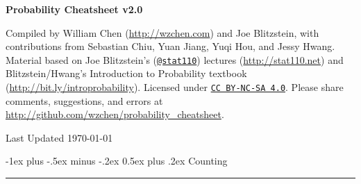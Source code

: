 \documentclass[10pt,landscape]{article}
\makeatletter
\renewcommand{\section}{\@startsection{section}{1}{0mm}%
                                {-1ex plus -.5ex minus -.2ex}%
                                {0.5ex plus .2ex}%
                                {\normalfont\large\bfseries}}
\renewcommand{\subsection}{\@startsection{subsection}{2}{0mm}%
                                {-1explus -.5ex minus -.2ex}%
                                {0.5ex plus .2ex}%
                                {\normalfont\normalsize\bfseries}}
\makeatother
\begin{document}
\raggedright
\footnotesize
\begin{multicols*}{3}

\setlength{\premulticols}{1pt}
\setlength{\postmulticols}{1pt}
\setlength{\multicolsep}{1pt}
\setlength{\columnsep}{2pt}


\begin{center}
    {\color{blue} \Large{\textbf{Probability Cheatsheet v2.0}}} \\
\end{center}


\scriptsize

Compiled by William Chen (\url{http://wzchen.com}) and Joe Blitzstein, with contributions from Sebastian Chiu, Yuan Jiang, Yuqi Hou, and Jessy Hwang. Material based on Joe Blitzstein's (\texttt{\href{http://twitter.com/stat110}{@stat110}}) lectures (\url{http://stat110.net}) and Blitzstein/Hwang's Introduction to Probability textbook (\url{http://bit.ly/introprobability}). Licensed under \texttt{\href{http://creativecommons.org/licenses/by-nc-sa/4.0/}{CC BY-NC-SA 4.0}}. Please share comments, suggestions, and errors at \url{http://github.com/wzchen/probability_cheatsheet}.

\begin{center}
    Last Updated \today
\end{center}




\section{Counting}\smallskip \hrule height 2pt \smallskip



\end{multicols*}
\end{document}
